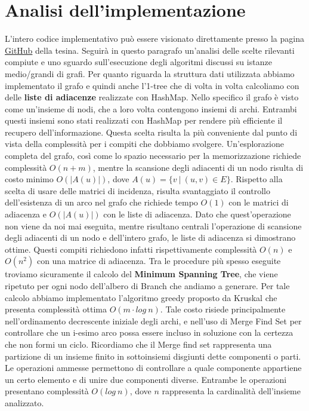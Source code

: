 \documentclass[
	article,			%
	12pt,				%
	oneside,			%
	a4paper,			%
	english,			%
	italian,				%
	sumario=tradicional,
	]{abntex2}
\begin{document}
\section{Analisi dell'implementazione}
L'intero codice implementativo può essere visionato direttamente presso la pagina \href{https://github.com/LorenzoSciandra/TesinaOttimizzazioneCombinatoria}{GitHub} della tesina. Seguirà in questo paragrafo un'analisi delle scelte rilevanti compiute e uno sguardo sull'esecuzione degli algoritmi discussi su istanze medio/grandi di grafi.
\newline
\newline
Per quanto riguarda la struttura dati utilizzata abbiamo implementato il grafo e quindi anche l'1-tree che di volta in volta calcoliamo con delle \textbf{liste di adiacenze} realizzate con HashMap. Nello specifico il grafo è visto come un'insieme di nodi, che a loro volta contengono insiemi di archi. Entrambi questi insiemi sono stati realizzati con HashMap per rendere più efficiente il recupero dell'informazione. Questa scelta risulta la più conveniente dal punto di vista della complessità per i compiti che dobbiamo svolgere. Un'esplorazione completa del grafo, così come lo spazio necessario per la memorizzazione richiede complessità $O(n+m)$, mentre la scansione degli adiacenti di un nodo risulta di costo minimo $O(|A(u)|)$, dove $A(u) = \{v \:|\: (u,v) \in E\}$.
\newline
Rispetto alla scelta di usare delle matrici di incidenza, risulta svantaggiato il controllo dell'esistenza di un arco nel grafo che richiede tempo $O(1)$ con le matrici di adiacenza e $O(|A(u)|)$ con le liste di adiacenza. Dato che quest'operazione non viene da noi mai eseguita, mentre risultano centrali l'operazione di scansione degli adiacenti di un nodo e dell'intero grafo, le liste di adiacenza si dimostrano ottime. Questi compiti richiedono infatti rispettivamente complessità $O(n)$ e $O(n^2)$ con una matrice di adiacenza. 
\newline
\newline
Tra le procedure più spesso eseguite troviamo sicuramente il calcolo del \textbf{Minimum Spanning Tree}, che viene ripetuto per ogni nodo dell'albero di Branch che andiamo a generare. Per tale calcolo abbiamo implementato l'algoritmo greedy proposto da Kruskal che presenta complessità ottima $O(m \cdot log\:n)$. Tale costo risiede principalmente nell'ordinamento decrescente iniziale degli archi, e nell'uso di Merge Find Set per controllare che un i-esimo arco possa essere incluso in soluzione con la certezza che non formi un ciclo. Ricordiamo che il Merge find set rappresenta una partizione di un insieme finito in sottoinsiemi disgiunti dette componenti o parti. Le operazioni ammesse permettono di controllare a quale componente appartiene un certo elemento e di unire due componenti diverse. Entrambe le operazioni presentano complessità $O(log\: n)$, dove $n$ rappresenta la cardinalità dell'insieme analizzato.
\end{document}
